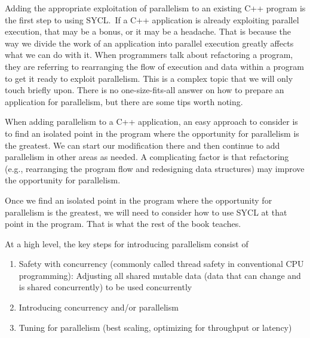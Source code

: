 Adding the appropriate exploitation of parallelism to an existing C++ program is the first step to using SYCL. If a C++ application is already exploiting parallel execution, that may be a bonus, or it may be a headache. That is because the way we divide the work of an application into parallel execution greatly affects what we can do with it. When programmers talk about refactoring a program, they are referring to rearranging the flow of execution and data within a program to get it ready to exploit parallelism. This is a complex topic that we will only touch briefly upon. There is no one-size-fits-all answer on how to prepare an application for parallelism, but there are some tips worth noting.\par

When adding parallelism to a C++ application, an easy approach to consider is to find an isolated point in the program where the opportunity for parallelism is the greatest. We can start our modification there and then continue to add parallelism in other areas as needed. A complicating factor is that refactoring (e.g., rearranging the program flow and redesigning data structures) may improve the opportunity for parallelism.\par

Once we find an isolated point in the program where the opportunity for parallelism is the greatest, we will need to consider how to use SYCL at that point in the program. That is what the rest of the book teaches.\par

At a high level, the key steps for introducing parallelism consist of\par

\begin{enumerate}
	\item Safety with concurrency (commonly called thread safety in conventional CPU programming): Adjusting all shared mutable data (data that can 	change and is shared concurrently) to be used concurrently
	\item Introducing concurrency and/or parallelism
	\item Tuning for parallelism (best scaling, optimizing for throughput or latency)
\end{enumerate}

